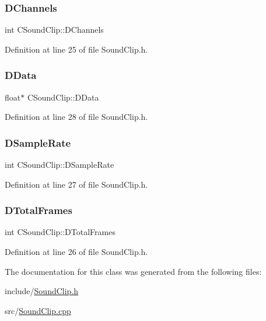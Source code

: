 \subsubsection{\texorpdfstring{D\+Channels}{DChannels}}
{\footnotesize\ttfamily int C\+Sound\+Clip\+::\+D\+Channels\hspace{0.3cm}{\ttfamily [protected]}}



Definition at line 25 of file Sound\+Clip.\+h.

\hypertarget{classCSoundClip_a220921a0c81e5c63e2cd3c55c75878b1}{}\label{classCSoundClip_a220921a0c81e5c63e2cd3c55c75878b1} 
\subsubsection{\texorpdfstring{D\+Data}{DData}}
{\footnotesize\ttfamily float$\ast$ C\+Sound\+Clip\+::\+D\+Data\hspace{0.3cm}{\ttfamily [protected]}}



Definition at line 28 of file Sound\+Clip.\+h.

\hypertarget{classCSoundClip_ac1b9306140da2f89f6178833e0a9b887}{}\label{classCSoundClip_ac1b9306140da2f89f6178833e0a9b887} 
\subsubsection{\texorpdfstring{D\+Sample\+Rate}{DSampleRate}}
{\footnotesize\ttfamily int C\+Sound\+Clip\+::\+D\+Sample\+Rate\hspace{0.3cm}{\ttfamily [protected]}}



Definition at line 27 of file Sound\+Clip.\+h.

\hypertarget{classCSoundClip_ab0d9eb261d09fa2a106658276f37285b}{}\label{classCSoundClip_ab0d9eb261d09fa2a106658276f37285b} 
\subsubsection{\texorpdfstring{D\+Total\+Frames}{DTotalFrames}}
{\footnotesize\ttfamily int C\+Sound\+Clip\+::\+D\+Total\+Frames\hspace{0.3cm}{\ttfamily [protected]}}



Definition at line 26 of file Sound\+Clip.\+h.



The documentation for this class was generated from the following files\+:\begin{DoxyCompactItemize}
\item 
include/\hyperlink{SoundClip_8h}{Sound\+Clip.\+h}\item 
src/\hyperlink{SoundClip_8cpp}{Sound\+Clip.\+cpp}\end{DoxyCompactItemize}
